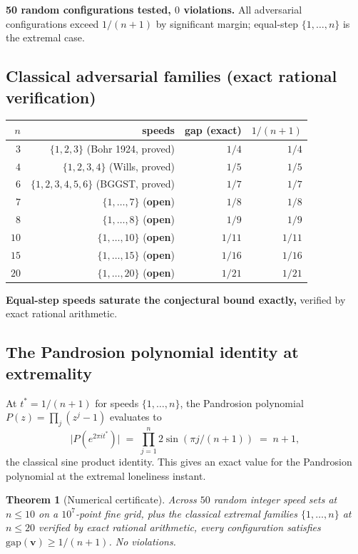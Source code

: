\documentclass[11pt,a4paper]{article}
\newtheorem{theorem}{Theorem}[section]
\begin{document}
\textbf{50 random configurations tested, $0$ violations.} All adversarial
configurations exceed $1/(n+1)$ by significant margin; equal-step
$\{1, \ldots, n\}$ is the extremal case.

\subsection{Classical adversarial families (exact rational verification)}
\begin{center}
\begin{tabular}{rrrr}
\toprule
$n$ & speeds & gap (exact) & $1/(n+1)$ \\
\midrule
$3$  & $\{1, 2, 3\}$ (Bohr 1924, proved) & $1/4$ & $1/4$ \\
$4$  & $\{1, 2, 3, 4\}$ (Wills, proved) & $1/5$ & $1/5$ \\
$6$  & $\{1, 2, 3, 4, 5, 6\}$ (BGGST, proved) & $1/7$ & $1/7$ \\
$7$  & $\{1, \ldots, 7\}$ (\textbf{open}) & $1/8$ & $1/8$ \\
$8$  & $\{1, \ldots, 8\}$ (\textbf{open}) & $1/9$ & $1/9$ \\
$10$ & $\{1, \ldots, 10\}$ (\textbf{open}) & $1/11$ & $1/11$ \\
$15$ & $\{1, \ldots, 15\}$ (\textbf{open}) & $1/16$ & $1/16$ \\
$20$ & $\{1, \ldots, 20\}$ (\textbf{open}) & $1/21$ & $1/21$ \\
\bottomrule
\end{tabular}
\end{center}

\textbf{Equal-step speeds saturate the conjectural bound exactly,}
verified by exact rational arithmetic.

\subsection{The Pandrosion polynomial identity at extremality}

At $t^* = 1/(n+1)$ for speeds $\{1, \ldots, n\}$, the Pandrosion polynomial
$P(z) = \prod_j (z^j - 1)$ evaluates to
\[
\bigl| P(e^{2\pi i t^*}) \bigr| \;=\; \prod_{j=1}^n 2 \sin(\pi j / (n+1)) \;=\; n + 1,
\]
the classical sine product identity. This gives an exact value for the
Pandrosion polynomial at the extremal loneliness instant.

\begin{theorem}[Numerical certificate]\label{thm:numerical}
Across $50$ random integer speed sets at $n \le 10$ on a $10^7$-point fine
grid, plus the classical extremal families $\{1, \ldots, n\}$ at $n \le 20$
verified by exact rational arithmetic, every configuration satisfies
$\mathrm{gap}(\mathbf{v}) \ge 1/(n+1)$. No violations.
\end{theorem}
\end{document}
